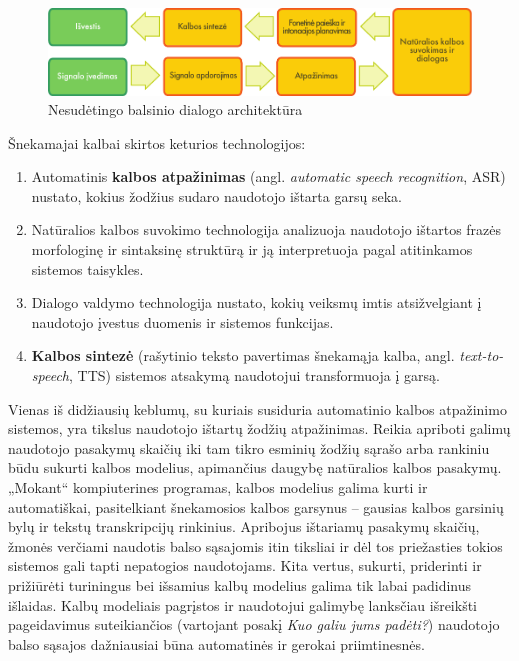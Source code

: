 \begin{multicols}{2}
\begin{figure}[htb]
  \center 
  \includegraphics[width=\textwidth]{../_media/lithuanian/simple_speech-based_dialogue_architecture}
  \caption{Nesudėtingo balsinio dialogo architektūra}
  \label{fig:dialoguearch_de}
\end{figure}

Šnekamajai kalbai skirtos keturios technologijos:

\begin{enumerate}
\item Automatinis \textbf{kalbos atpažinimas} (angl. \textit{automatic speech recognition}, ASR) nustato, kokius žodžius sudaro naudotojo ištarta garsų seka.
\item Natūralios kalbos suvokimo technologija analizuoja naudotojo ištartos frazės morfologinę ir sintaksinę struktūrą ir ją interpretuoja pagal atitinkamos sistemos taisykles.
\item  Dialogo valdymo technologija nustato, kokių veiksmų imtis atsižvelgiant į naudotojo įvestus duomenis ir sistemos funkcijas.    
\item \textbf{Kalbos sintezė} (rašytinio teksto pavertimas šnekamąja kalba, angl. \textit{text-to-speech}, TTS) sistemos atsakymą naudotojui transformuoja į garsą.
\end{enumerate}

Vienas iš didžiausių keblumų, su kuriais susiduria automatinio kalbos atpažinimo sistemos, yra tikslus naudotojo ištartų žodžių atpažinimas. Reikia apriboti galimų naudotojo pasakymų skaičių iki tam tikro esminių žodžių sąrašo arba rankiniu būdu sukurti kalbos modelius, apimančius daugybę natūralios kalbos pasakymų. „Mokant“   kompiuterines programas, kalbos modelius galima kurti ir automatiškai, pasitelkiant šnekamosios kalbos garsynus – gausias kalbos garsinių bylų ir tekstų transkripcijų rinkinius. Apribojus ištariamų pasakymų skaičių, žmonės verčiami naudotis balso sąsajomis itin tiksliai ir dėl tos priežasties tokios sistemos gali tapti nepatogios naudotojams. Kita vertus, sukurti, priderinti ir prižiūrėti turiningus bei išsamius kalbų modelius galima tik labai padidinus išlaidas. Kalbų modeliais pagrįstos ir naudotojui galimybę lanksčiau išreikšti pageidavimus suteikiančios (vartojant posakį \textit{Kuo galiu jums padėti?}) naudotojo balso sąsajos dažniausiai būna automatinės ir gerokai priimtinesnės. 


\end{multicols}
